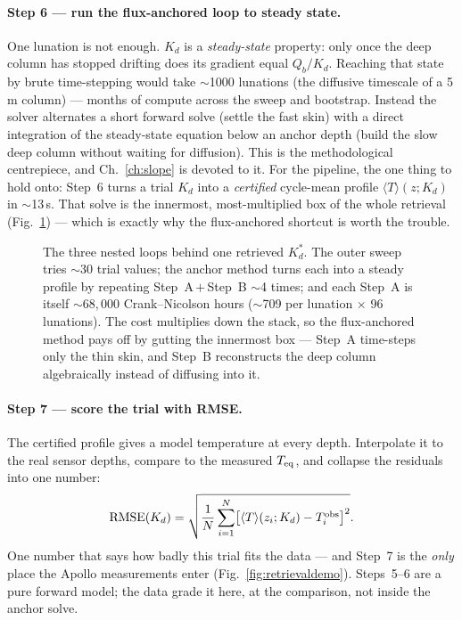 \documentclass[11pt]{report}
\newcommand{\Tm}{\langle T\rangle}
\begin{document}
\paragraph{\textbf{Step 6 --- run the flux-anchored loop to steady state.}}
One lunation is not enough. $K_d$ is a \emph{steady-state} property: only once
the deep column has stopped drifting does its gradient equal $Q_b/K_d$. Reaching
that state by brute time-stepping would take $\sim$1000 lunations (the diffusive
timescale of a 5\,m column) --- months of compute across the sweep and bootstrap.
Instead the solver alternates a short forward solve (settle the fast skin) with a
direct integration of the steady-state equation below an anchor depth (build the
slow deep column without waiting for diffusion). This is the methodological
centrepiece, and Ch.~\ref{ch:slope} is devoted to it. For the pipeline, the one
thing to hold onto: Step~6 turns a trial $K_d$ into a \emph{certified}
cycle-mean profile $\Tm(z;K_d)$ in $\sim$13\,s. That solve is the innermost,
most-multiplied box of the whole retrieval (Fig.~\ref{fig:costnesting}) --- which
is exactly why the flux-anchored shortcut is worth the trouble.

\begin{figure}[htbp]\centering

\caption{The three nested loops behind one retrieved $K_d^{*}$. The outer sweep
tries ${\sim}30$ trial values; the anchor method turns each into a steady profile
by repeating Step~A\,$+$\,Step~B $\sim$4 times; and each Step~A is itself
${\sim}68{,}000$ Crank--Nicolson hours ($\sim$709 per lunation $\times$ 96
lunations). The cost multiplies down the stack, so the flux-anchored method pays
off by gutting the innermost box --- Step~A time-steps only the thin skin, and
Step~B reconstructs the deep column algebraically instead of diffusing into it.}
\label{fig:costnesting}
\end{figure}

\paragraph{\textbf{Step 7 --- score the trial with RMSE.}}
The certified profile gives a model temperature at every depth. Interpolate it to
the real sensor depths, compare to the measured $T_{\rm eq}$, and collapse the
residuals into one number:
\begin{equation}
\mathrm{RMSE}(K_d)=\sqrt{\frac{1}{N}\sum_{i=1}^{N}\bigl[\Tm(z_i;K_d)-T^{\rm obs}_i\bigr]^2}.
\label{eq:rmse}
\end{equation}
One number that says how badly this trial fits the data --- and Step~7 is the
\emph{only} place the Apollo measurements enter (Fig.~\ref{fig:retrievaldemo}).
Steps~5--6 are a pure forward model; the data grade it here, at the comparison,
not inside the anchor solve.
\end{document}
